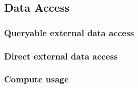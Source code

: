 \documentclass{article}
\begin{document}

\subsection{Data Access}
\subsubsection{Queryable external data access}


\subsubsection{Direct external data access}


\subsubsection{Compute usage}

\end{document}
